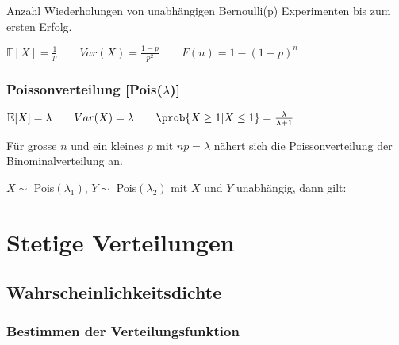 \documentclass[8pt,a4paper]{scrartcl}
\begin{document}
\begin{multicols*}{3}
Anzahl Wiederholungen von unabhängigen Bernoulli(p) Experimenten bis zum ersten Erfolg.


$\mathbb{E}[X]=\frac{1}{p}\qquad Var(X)=\frac{1-p}{p^2}\qquad F(n)=1-(1-p)^n$

\subsubsection{Poissonverteilung [Pois($\lambda$)]}


$\mathbb{E}[X]=\lambda\qquad Var(X)=\lambda\qquad \prob{X\geq 1|X\leq 1}=\frac{\lambda}{\lambda+1}$

Für grosse $n$ und ein kleines $p$ mit $np=\lambda$ nähert sich die Poissonverteilung der Binominalverteilung an.


\finn

$X\sim$ Pois$(\lambda_1)$, $Y\sim$ Pois$(\lambda_2)$ mit $X$ und $Y$ unabhängig, dann gilt:



\section{Stetige Verteilungen}

\subsection{Wahrscheinlichkeitsdichte}




\subsubsection*{Bestimmen der Verteilungsfunktion}



\end{multicols*}
\end{document}
